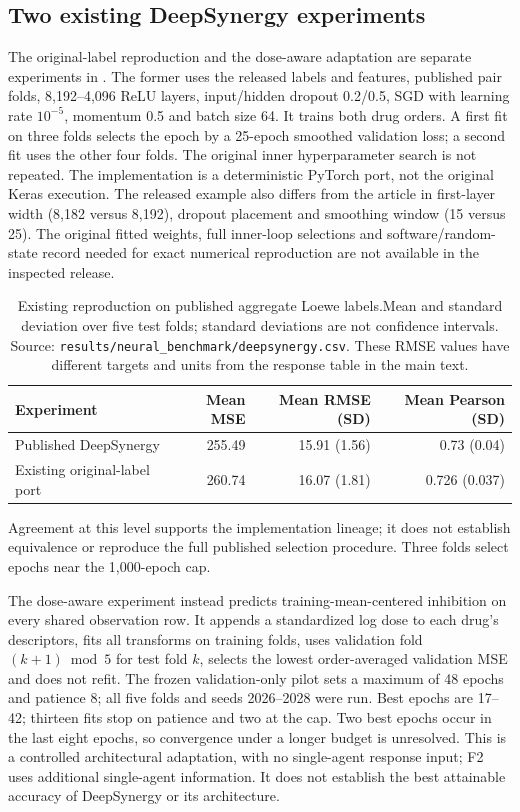 \documentclass[11pt]{article}
\begin{document}
\subsection{Two existing DeepSynergy experiments}
The original-label reproduction and the dose-aware adaptation are separate experiments in . The former uses the released labels and features, published pair folds, 8,192--4,096 ReLU layers, input/hidden dropout 0.2/0.5, SGD with learning rate $10^{-5}$, momentum 0.5 and batch size 64. It trains both drug orders. A first fit on three folds selects the epoch by a 25-epoch smoothed validation loss; a second fit uses the other four folds. The original inner hyperparameter search is not repeated. The implementation is a deterministic PyTorch port, not the original Keras execution. The released example also differs from the article in first-layer width (8,182 versus 8,192), dropout placement and smoothing window (15 versus 25). The original fitted weights, full inner-loop selections and software/random-state record needed for exact numerical reproduction are not available in the inspected release.

\begin{table}[htbp]
\caption{Existing reproduction on published aggregate Loewe labels.\newline Mean and standard deviation over five test folds; standard deviations are not confidence intervals. Source: \texttt{results/neural\_benchmark/deepsynergy.csv}. These RMSE values have different targets and units from the response table in the main text.}\label{tab:DSoriginal}
\centering\small
\begin{tabularx}{\linewidth}{@{}L r r r@{}}
\toprule
Experiment & Mean MSE & Mean RMSE (SD) & Mean Pearson (SD) \\
\midrule
Published DeepSynergy & 255.49 & 15.91 (1.56) & 0.73 (0.04) \\
Existing original-label port & 260.74 & 16.07 (1.81) & 0.726 (0.037) \\
\bottomrule
\end{tabularx}
\end{table}
Agreement at this level supports the implementation lineage; it does not establish equivalence or reproduce the full published selection procedure. Three folds select epochs near the 1,000-epoch cap.

The dose-aware experiment instead predicts training-mean-centered inhibition on every shared observation row. It appends a standardized log dose to each drug's descriptors, fits all transforms on training folds, uses validation fold $(k+1)\bmod5$ for test fold $k$, selects the lowest order-averaged validation MSE and does not refit. The frozen validation-only pilot sets a maximum of 48 epochs and patience 8; all five folds and seeds 2026--2028 were run. Best epochs are 17--42; thirteen fits stop on patience and two at the cap. Two best epochs occur in the last eight epochs, so convergence under a longer budget is unresolved. This is a controlled architectural adaptation, with no single-agent response input; F2 uses additional single-agent information. It does not establish the best attainable accuracy of DeepSynergy or its architecture.
\end{document}
